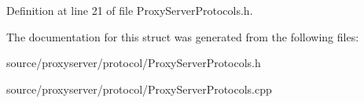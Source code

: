 Definition at line 21 of file Proxy\-Server\-Protocols.\-h.



The documentation for this struct was generated from the following files\-:\begin{DoxyCompactItemize}
\item 
source/proxyserver/protocol/Proxy\-Server\-Protocols.\-h\item 
source/proxyserver/protocol/Proxy\-Server\-Protocols.\-cpp\end{DoxyCompactItemize}
